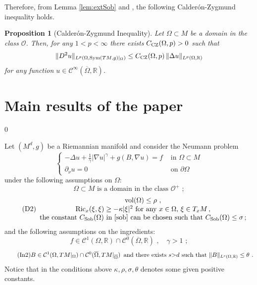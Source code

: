 \documentclass[10pt, a4paper, reqno, oneside]{amsart}
\theoremstyle{plain}
\newtheorem{prop}[theo]{Proposition}
\theoremstyle{definition}
\theoremstyle{plain}
\theoremstyle{definition}
\theoremstyle{plain}
\renewcommand{\=}{:=}
\begin{document}
Therefore, from Lemma \ref{lem:extSob} and \cite[Thm 4.1]{GunPig}, the following Calder\'on-Zygmund inequality holds.

\begin{prop}[Calder\'on-Zygmund Inequality]\label{czineq}
Let $\Omega \subset M$ be a domain in the class $\mathcal{O}$. Then, for any $1 < p < \infty$ there exists $C_{\rm CZ}(\Omega,p)>0$ such that
\begin{equation}
\|D^2u\|_{L^p(\Omega,{\rm Sym}(TM,g)|_{\Omega})} \leq C_{\rm CZ}(\Omega,p) \, \|\Delta u\|_{L^p(\Omega,\mathbb{R})}
\end{equation}
for any function $u \in \mathcal{C}^{\infty}(\overline{\Omega},\mathbb{R})$.
\end{prop}

\medskip
\section{Main results of the paper} \label{sect_3}
\setcounter{equation} 0

Let $(M^d,g)$ be a Riemannian manifold and consider the Neumann problem
\begin{equation} \label{hjn}
\begin{cases}
-\Delta u+ \tfrac1{\gamma}|\nabla u|^\gamma+g(B,\nabla u) =f & \text{ in }\Omega\subset M \\
\partial_\nu u=0&\text{ on } \partial\Omega 
\end{cases}
\end{equation}
under the following assumptions on $\Omega$:
\begin{equation} \label{D1} \tag{D1}
\text{$\Omega \subset M$ is a domain in the class $\mathcal{O}^+$}\,\, ;
\end{equation}
\begin{equation} \label{D2} \tag{D2}
\begin{array}{c}
{\rm vol}(\Omega) \leq \rho \,\, , \\[0.5pt]
\text{$\mathrm{Ric}_x(\xi,\xi)\geq -\kappa |\xi|^2$ for any $x \in \Omega$, $\xi \in T_xM$}\, , \\
\text{the constant $C_{\rm Sob}(\Omega)$ in \eqref{sob} can be chosen such that $C_{\rm Sob}(\Omega)\leq\sigma$}\, ;
\end{array}
\end{equation}
and the following assumptions on the ingredients:
\begin{equation} \label{In1} \tag{In1}
\text{$f \in \mathcal{C}^1(\Omega,\mathbb{R}) \cap \mathcal{C}^0(\overline{\Omega},\mathbb{R})$}\,\, , \quad \text{$\gamma>1$} \,\, ;
\end{equation}
\begin{equation} \label{In2} \tag{In2}
\text{$B \in \mathcal{C}^1(\Omega,TM|_{\Omega}) \cap \mathcal{C}^0(\overline{\Omega},TM|_{\overline{\Omega}})$\, and there exists $s{>}d$ such that $\|B\|_{L^s(\Omega,\mathbb{R})} \leq \theta$} \,\, .
\end{equation}
Notice that in the conditions above $\kappa,\rho,\sigma,\theta$ denotes some given positive constants. \smallskip
\end{document}

